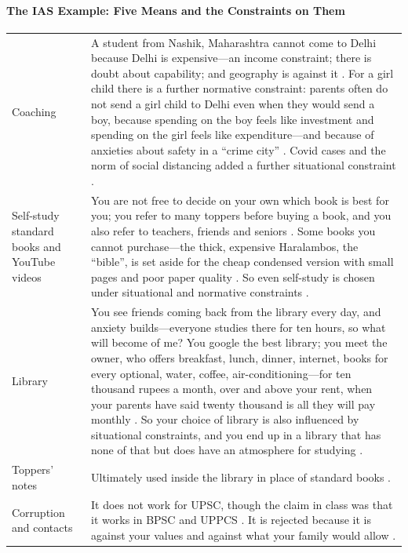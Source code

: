 \paragraph{The IAS Example: Five Means and the Constraints on Them}
\vspace{6pt}
\noindent
\begin{tabularx}{\textwidth}{>{\hsize}Y >{\hsize}Y}
\toprule
{}
 &  \\
\midrule
Coaching & A student from Nashik, Maharashtra cannot come to Delhi because Delhi is expensive---an income constraint; there is doubt about capability; and geography is against it . For a girl child there is a further normative constraint: parents often do not send a girl child to Delhi even when they would send a boy, because spending on the boy feels like investment and spending on the girl feels like expenditure---and because of anxieties about safety in a ``crime city'' . Covid cases and the norm of social distancing added a further situational constraint . \\
\midrule
Self-study standard books and YouTube videos & You are not free to decide on your own which book is best for you; you refer to many toppers before buying a book, and you also refer to teachers, friends and seniors . Some books you cannot purchase---the thick, expensive Haralambos, the ``bible'', is set aside for the cheap condensed version with small pages and poor paper quality . So even self-study is chosen under situational and normative constraints . \\
\midrule
Library & You see friends coming back from the library every day, and anxiety builds---everyone studies there for ten hours, so what will become of me? You google the best library; you meet the owner, who offers breakfast, lunch, dinner, internet, books for every optional, water, coffee, air-conditioning---for ten thousand rupees a month, over and above your rent, when your parents have said twenty thousand is all they will pay monthly . So your choice of library is also influenced by situational constraints, and you end up in a library that has none of that but does have an atmosphere for studying . \\
\midrule
Toppers' notes & Ultimately used inside the library in place of standard books . \\
\midrule
Corruption and contacts & It does not work for UPSC, though the claim in class was that it works in BPSC and UPPCS . It is rejected because it is against your values and against what your family would allow . \\
\bottomrule
\end{tabularx}
\vspace{6pt}

